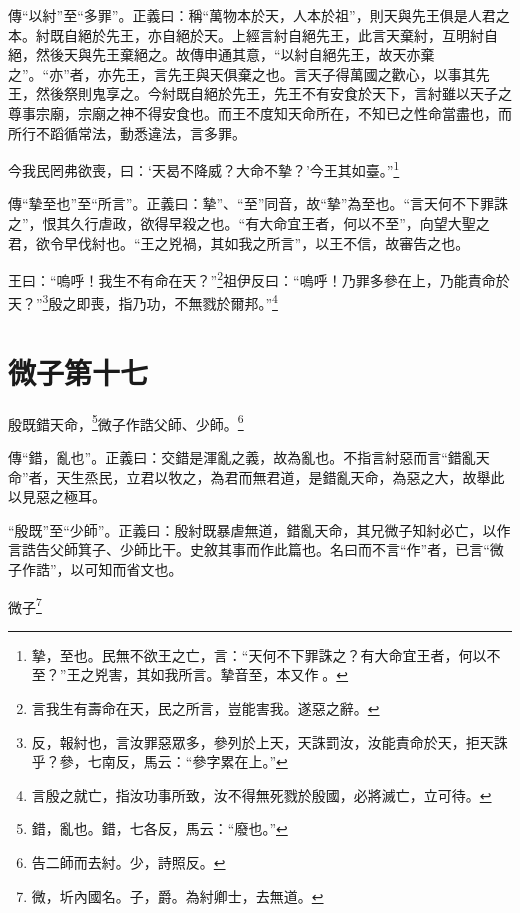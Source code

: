 {\noindent\zhuan{}\fzbyks 傳“以紂”至“多罪”。正義曰：稱“萬物本於天，人本於祖”，則天與先王俱是人君之本。紂既自絕於先王，亦自絕於天。上經言紂自絕先王，此言天棄紂，互明紂自絕，然後天與先王棄絕之。故傳申通其意，“以紂自絕先王，故天亦棄之”。“亦”者，亦先王，言先王與天俱棄之也。言天子得萬國之歡心，以事其先王，然後祭則鬼享之。今紂既自絕於先王，先王不有安食於天下，言紂雖以天子之尊事宗廟，宗廟之神不得安食也。而王不度知天命所在，不知已之性命當盡也，而所行不蹈循常法，動悉違法，言多罪。 \par}

今我民罔弗欲喪，曰：‘天曷不降威？大命不摯？’今王其如臺。”\footnote{摯，至也。民無不欲王之亡，言：“天何不下罪誅之？有大命宜王者，何以不至？”王之兇害，其如我所言。摯音至，本又作𡠗。}

{\noindent\zhuan{}\fzbyks 傳“摯至也”至“所言”。正義曰：摯”、“至”同音，故“摯”為至也。“言天何不下罪誅之”，恨其久行虐政，欲得早殺之也。“有大命宜王者，何以不至”，向望大聖之君，欲令早伐紂也。“王之兇禍，其如我之所言”，以王不信，故審告之也。 \par}

王曰：“嗚呼！我生不有命在天？”\footnote{言我生有壽命在天，民之所言，豈能害我。遂惡之辭。}祖伊反曰：“嗚呼！乃罪多參在上，乃能責命於天？”\footnote{反，報紂也，言汝罪惡眾多，參列於上天，天誅罰汝，汝能責命於天，拒天誅乎？參，七南反，馬云：“參字累在上。”}殷之即喪，指乃功，不無戮於爾邦。”\footnote{言殷之就亡，指汝功事所致，汝不得無死戮於殷國，必將滅亡，立可待。}

\section{微子第十七}


殷既錯天命，\footnote{錯，亂也。錯，七各反，馬云：“廢也。”}微子作誥父師、少師。\footnote{告二師而去紂。少，詩照反。}


{\noindent\zhuan{}\fzbyks 傳“錯，亂也”。正義曰：交錯是渾亂之義，故為亂也。不指言紂惡而言“錯亂天命”者，天生烝民，立君以牧之，為君而無君道，是錯亂天命，為惡之大，故舉此以見惡之極耳。 \par}

{\noindent\shu{}\fzkt “殷既”至“少師”。正義曰：殷紂既暴虐無道，錯亂天命，其兄微子知紂必亡，以作言誥告父師箕子、少師比干。史敘其事而作此篇也。名曰而不言“作”者，已言“微子作誥”，以可知而省文也。 \par}

微子\footnote{微，圻內國名。子，爵。為紂卿士，去無道。}

